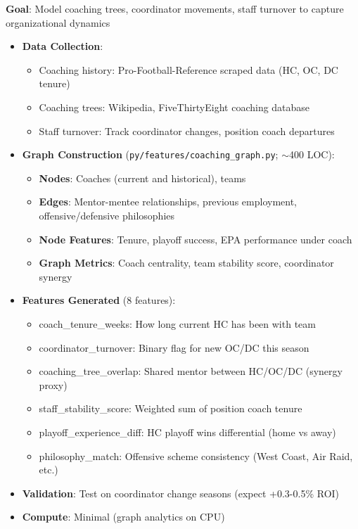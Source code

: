 \textbf{Goal}: Model coaching trees, coordinator movements, staff turnover to capture organizational dynamics

\begin{itemize}
  \item {} \textbf{Data Collection}:
  \begin{itemize}
    \item Coaching history: Pro-Football-Reference scraped data (HC, OC, DC tenure)
    \item Coaching trees: Wikipedia, FiveThirtyEight coaching database
    \item Staff turnover: Track coordinator changes, position coach departures
  \end{itemize}
  \item {} \textbf{Graph Construction} (\texttt{py/features/coaching\_graph.py}; $\sim$400 LOC):
  \begin{itemize}
    \item \textbf{Nodes}: Coaches (current and historical), teams
    \item \textbf{Edges}: Mentor-mentee relationships, previous employment, offensive/defensive philosophies
    \item \textbf{Node Features}: Tenure, playoff success, EPA performance under coach
    \item \textbf{Graph Metrics}: Coach centrality, team stability score, coordinator synergy
  \end{itemize}
  \item {} \textbf{Features Generated} (8 features):
  \begin{itemize}
    \item coach\_tenure\_weeks: How long current HC has been with team
    \item coordinator\_turnover: Binary flag for new OC/DC this season
    \item coaching\_tree\_overlap: Shared mentor between HC/OC/DC (synergy proxy)
    \item staff\_stability\_score: Weighted sum of position coach tenure
    \item playoff\_experience\_diff: HC playoff wins differential (home vs away)
    \item philosophy\_match: Offensive scheme consistency (West Coast, Air Raid, etc.)
  \end{itemize}
  \item {} \textbf{Validation}: Test on coordinator change seasons (expect +0.3-0.5\% ROI)
  \item \textbf{Compute}: Minimal (graph analytics on CPU)
\end{itemize}

